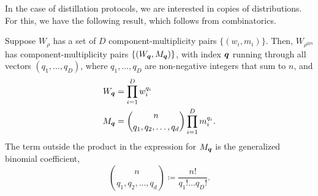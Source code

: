 \documentclass[pra,
aps,
twocolumn,
superscriptaddress,
groupedaddress,
nofootinbib,
reprint
]{revtex4-1}
\begin{document}
In the case of distillation protocols, we are interested in copies of distributions. 
For this, we have the following result, which follows from combinatorics.
\begin{proposition}\label{ncopycomponents}
	Suppose $W_\rho$ has a set of $D$ component-multiplicity pairs $\{(w_i, m_i)\}$. Then, $W_{\rho^{\otimes n}}$ has component-multiplicity pairs $\{(W_{\boldsymbol{q}}, M_{\boldsymbol{q}})\}$, with index $\boldsymbol{q}$ running through all vectors $(q_1, \dots, q_D)$, where $q_1, \dots, q_D$ are non-negative integers that sum to $n$, and
\begin{align}
	W_{\boldsymbol{q}} &= \prod_{i=1}^D w_i^{q_i} \label{eq:W}\\
	M_{\boldsymbol{q}} &= \binom{n}{q_1,q_2, \dots, q_d} \prod_{i=1}^D m_i^{q_i}. \label{eq:M}
\end{align}
The term outside the product in the expression for $M_{\boldsymbol{q}}$ is the generalized binomial coefficient,
\begin{equation}
	\binom{n}{q_1,q_2, \dots, q_d} \coloneqq \frac{n!}{q_1!\dots q_D!}.
\end{equation}
\end{proposition}
\end{document}
